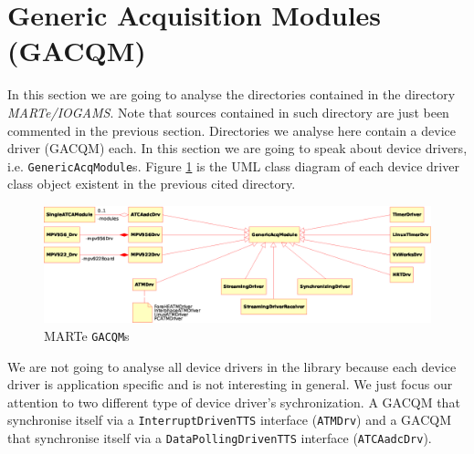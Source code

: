 


\section{Generic Acquisition Modules (GACQM)}
In this section we are going to analyse the directories contained in the directory \textit{MARTe/IOGAMS}. Note that sources contained in such directory are just been commented in the previous section. Directories we analyse here contain a device driver (GACQM) each. In this section we are going to speak about device drivers, i.e. \texttt{GenericAcqModule}s. Figure \ref{f:MARTe:IOGAMs_Drv} is the UML class diagram of each device driver class object existent in the previous cited directory. \\

\begin{figure}[h!]
 \begin{center}
  \includegraphics[width=\textwidth]{MARTe/IOGAMs-Drv.eps}
  \caption{MARTe \texttt{GACQM}s }
  \label{f:MARTe:IOGAMs_Drv}
 \end{center}
\end{figure}

We are not going to analyse all device drivers in the library because each device driver is application specific and is not interesting in general. We just focus our attention to two different type of device driver's sychronization. A GACQM that synchronise itself via a \texttt{InterruptDrivenTTS} interface (\texttt{ATMDrv}) and a GACQM that synchronise itself via a \texttt{DataPollingDrivenTTS} interface (\texttt{ATCAadcDrv}). \\

